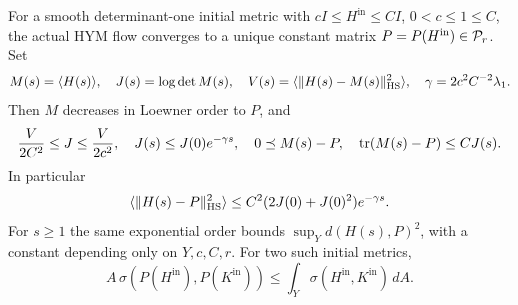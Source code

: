 \begin{theorem}\label{thm:component-phase}
For a smooth determinant-one initial metric with
$cI\le H^{\mathrm{in}}\le CI$, $0<c\le1\le C$,
the actual HYM flow converges to a unique constant
matrix $P=P(H^{\mathrm{in}})\in\mathcal P_r$.
Set
\[
 M(s)=\langle H(s)\rangle,\quad J(s)=\log\det M(s),
 \quad V(s)=\langle\|H(s)-M(s)\|_{\mathrm{HS}}^2\rangle,
 \quad \gamma=2c^2C^{-2}\lambda_1 .
\]
Then $M$ decreases in Loewner order to $P$, and
\begin{equation}\label{eq:phase-entropy}
 \frac{V}{2C^2}\le J\le\frac{V}{2c^2},\quad
 J(s)\le J(0)e^{-\gamma s},\quad
 0\preceq M(s)-P,\quad \operatorname{tr}(M(s)-P)\le CJ(s).
\end{equation}
In particular
\begin{equation}\label{eq:phase-l2}
 \langle\|H(s)-P\|_{\mathrm{HS}}^2\rangle
 \le C^2(2J(0)+J(0)^2)e^{-\gamma s}.
\end{equation}
For $s\ge1$ the same exponential order bounds
$\sup_Y d(H(s),P)^2$, with a constant depending
only on $Y,c,C,r$. For two such initial metrics,
\begin{equation}\label{eq:phase-contraction}
 A\,\sigma(P(H^{\mathrm{in}}),P(K^{\mathrm{in}}))
 \le\int_Y\sigma(H^{\mathrm{in}},K^{\mathrm{in}})\,dA .
\end{equation}
\end{theorem}
